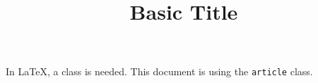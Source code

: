 \documentclass{article}
\title{Basic Title}
\begin{document}
\maketitle

In {\LaTeX}, a class is needed.
This document is using the \texttt{article} class.
\end{document}

